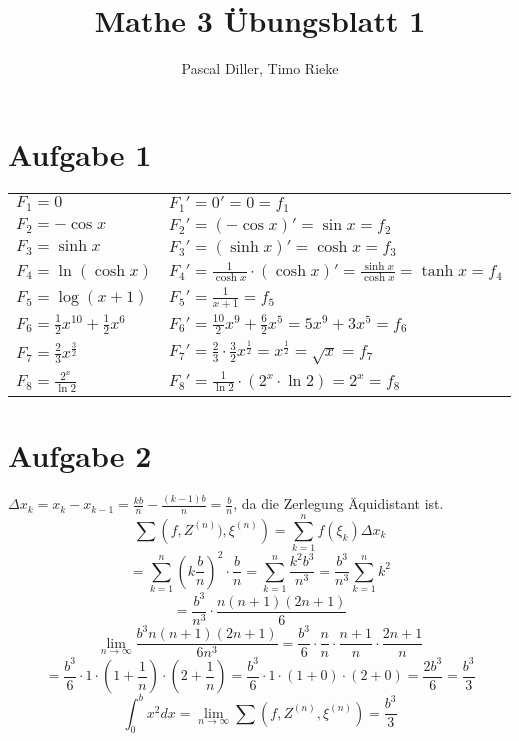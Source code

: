 \documentclass{article}
\title{Mathe 3 Übungsblatt 1}
\author{Pascal Diller, Timo Rieke}
\date{}
\begin{document}
\maketitle

\section*{Aufgabe 1}
\begin{tabular}{l l}
    $F_1 = 0$ & $F_1' = 0' = 0 = f_1$ \\
    $F_2 = -\cos x$ & $F_2' = (-\cos x)' = \sin x = f_2$ \\
    $F_3 = \sinh x$ & $F_3' = (\sinh x)' = \cosh x = f_3$ \\
    $F_4 = \ln(\cosh x)$ & $F_4' = \frac{1}{\cosh x} \cdot (\cosh x)' = \frac{\sinh x}{\cosh x} = \tanh x = f_4$ \\
    $F_5 = \log(x+1)$ & $F_5' = \frac{1}{x + 1} = f_5$ \\
    $F_6 = \frac{1}{2}x^{10} + \frac{1}{2}x^{6}$ & $F_6' = \frac{10}{2}x^9 + \frac{6}{2}x^5 = 5x^9 + 3x^5 = f_6$ \\
    $F_7 = \frac{2}{3}x^{\frac{3}{2}}$ & $F_7' = \frac{2}{3} \cdot \frac{3}{2} x ^{\frac{1}{2}} = x^{\frac{1}{2}} = \sqrt x = f_7$ \\
    $F_8 = \frac{2^x}{\ln 2}$ & $F_8' = \frac{1}{\ln 2} \cdot (2^x \cdot \ln 2) = 2^x = f_8$ \\
\end{tabular}

\section*{Aufgabe 2}
$\Delta x_k = x_k - x_{k-1} = \frac{kb}{n} - \frac{(k-1)b}{n} = \frac{b}{n}$, da die Zerlegung Äquidistant ist. \\
\[\sum \left(f, Z^{(n)}), \xi^{(n)}\right) = \sum^{n}_{k=1} f(\xi_k) \Delta x_k\]
\[= \sum^{n}_{k=1} \left( k \frac{b}{n} \right)^2 \cdot \frac{b}{n} = \sum^{n}_{k=1} \frac{k^2 b^3}{n^3} = \frac{b^3}{n^3} \sum^{n}_{k=1} k^2\]
\[= \frac{b^3}{n^3} \cdot \frac{n(n+1)(2n+1)}{6}\]
\newline
\[\lim_{n \to \infty} \frac{b^3 n(n+1)(2n+1)}{6n^3} = \frac{b^3}{6} \cdot \frac{n}{n}\cdot  \frac{n+1}{n} \cdot \frac{2n +1}{n}\]
\[= \frac{b^3}{6} \cdot 1 \cdot (1 + \frac{1}{n}) \cdot (2 + \frac{1}{n}) = \frac{b^3}{6} \cdot 1 \cdot (1 + 0) \cdot (2 + 0) = \frac{2b^3}{6} = \frac{b^3}{3}\]
\newline
\[\int_{0}^{b} x^2 dx = \lim_{n \to \infty} \sum \left( f, Z^{(n)}, \xi^{(n)} \right) = \frac{b^3}{3}\]
\end{document}
